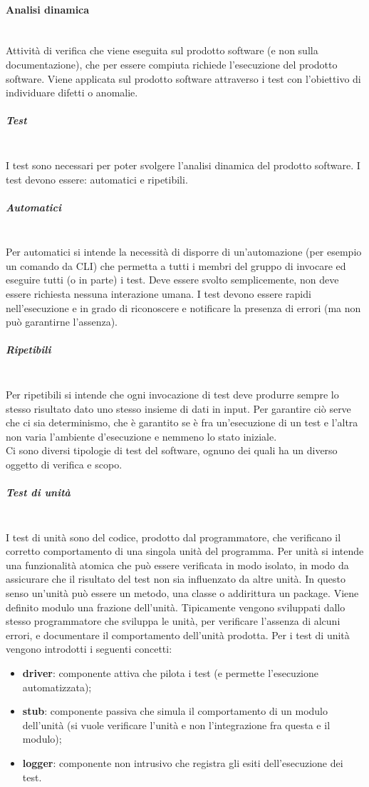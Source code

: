\paragraph{Analisi dinamica} \mbox{}\\
Attività di verifica che viene eseguita sul prodotto software (e non sulla documentazione), che per essere compiuta richiede l’esecuzione del prodotto software.
Viene applicata sul prodotto software attraverso i test con l’obiettivo di individuare difetti o anomalie.

\subparagraph{Test} \mbox{}\\
I test sono necessari per poter svolgere l'analisi dinamica del prodotto software.
I test devono essere: automatici e ripetibili.
\subparagraph*{Automatici} \mbox{}\\ 
Per automatici si intende la necessità di disporre di un'automazione (per esempio un comando da CLI) che permetta a tutti i membri del gruppo di invocare ed eseguire tutti (o in parte) i test.
Deve essere svolto semplicemente, non deve essere richiesta nessuna interazione umana.
I test devono essere rapidi nell’esecuzione e in grado di riconoscere e notificare la presenza di errori (ma non può garantirne l'assenza).
\subparagraph*{Ripetibili} \mbox{}\\
Per ripetibili si intende che ogni invocazione di test deve produrre sempre lo stesso risultato dato uno stesso insieme di dati in input. Per garantire ciò serve che ci sia determinismo, che è garantito se è fra un'esecuzione di un test e l'altra non varia l'ambiente d'esecuzione e nemmeno lo stato iniziale.\\

Ci sono diversi tipologie di test del software, ognuno dei quali ha un diverso oggetto di verifica e scopo.

\subparagraph{Test di unità} \mbox{}\\
I test di unità sono del codice, prodotto dal programmatore, che verificano il corretto comportamento di una singola unità del programma.
Per unità si intende una funzionalità atomica che può essere verificata in modo isolato, in modo da assicurare che il risultato del test non sia influenzato da altre unità. In questo senso un'unità può essere un metodo, una classe o addirittura un package.
Viene definito modulo una frazione dell'unità.
Tipicamente vengono sviluppati dallo stesso programmatore che sviluppa le unità, per verificare l’assenza di alcuni errori, e documentare il comportamento dell’unità prodotta.
Per i test di unità vengono introdotti i seguenti concetti:
\begin{itemize}
    \item \textbf{driver}: componente attiva che pilota i test (e permette l'esecuzione automatizzata);
    \item \textbf{stub}: componente passiva che simula il comportamento di un modulo dell'unità (si vuole verificare l'unità e non l'integrazione fra questa e il modulo);
    \item \textbf{logger}: componente non intrusivo che registra gli esiti dell'esecuzione dei test.
\end{itemize}

